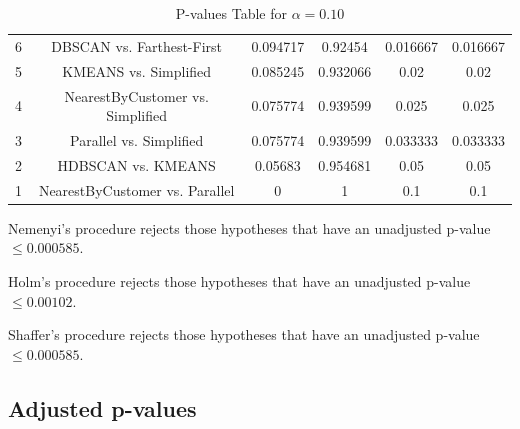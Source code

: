 \documentclass[a4paper,10pt]{article}
\begin{document}
\begin{landscape}
\begin{table}[!htp]
\begin{tabular}{cccccc}
6&DBSCAN vs. Farthest-First&0.094717&0.92454&0.016667&0.016667\\
5&KMEANS vs. Simplified&0.085245&0.932066&0.02&0.02\\
4&NearestByCustomer vs. Simplified&0.075774&0.939599&0.025&0.025\\
3&Parallel vs. Simplified&0.075774&0.939599&0.033333&0.033333\\
2&HDBSCAN vs. KMEANS&0.05683&0.954681&0.05&0.05\\
1&NearestByCustomer vs. Parallel&0&1&0.1&0.1\\
\hline
\end{tabular}
\caption{P-values Table for $\alpha=0.10$}
\end{table}Nemenyi's procedure rejects those hypotheses that have an unadjusted p-value $\le0.000585$.

Holm's procedure rejects those hypotheses that have an unadjusted p-value $\le0.00102$.

Shaffer's procedure rejects those hypotheses that have an unadjusted p-value $\le0.000585$.

\pagebreak

\subsection{Adjusted p-values}


\end{landscape}
\end{document}
